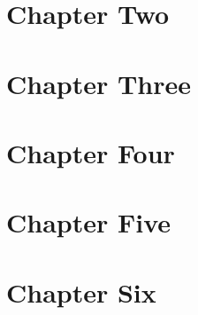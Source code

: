 \documentclass[smalldemyvopaper,11pt,twoside,onecolumn,openright,extrafontsizes]{memoir}
\begin{document}
\chapter{Chapter Two}
\lipsum[21-40]
\chapter{Chapter Three}
\lipsum[41-60]
\chapter{Chapter Four}
\lipsum[61-80]
\chapter{Chapter Five}
\lipsum[81-100]
\chapter{Chapter Six}
\lipsum[101-120]
\end{document}
